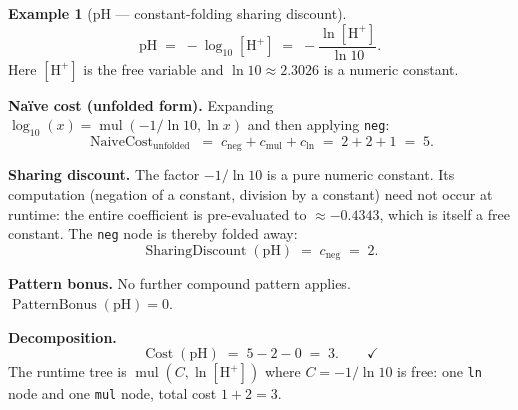 \documentclass[12pt,a4paper]{article}
\theoremstyle{definition}
\newtheorem{example}[theorem]{Example}
\newcommand{\Cost}{\operatorname{Cost}}
\newcommand{\NC}{\operatorname{NaiveCost}}
\newcommand{\SD}{\operatorname{SharingDiscount}}
\newcommand{\PB}{\operatorname{PatternBonus}}
\begin{document}
\begin{example}[pH --- constant-folding sharing discount]
\label{ex:ph}
\[
  \mathrm{pH} \;=\; -\log_{10}[\mathrm{H}^+]
             \;=\; -\frac{\ln[\mathrm{H}^+]}{\ln 10}.
\]
Here $[\mathrm{H}^+]$ is the free variable and $\ln 10 \approx 2.3026$ is
a numeric constant.

\textbf{Na\"{i}ve cost (unfolded form).}
Expanding $\log_{10}(x) = \operatorname{mul}(-1/\ln10, \ln x)$ and
then applying \texttt{neg}:
\[
  \NC_{\mathrm{unfolded}} \;=\; c_{\mathrm{neg}} + c_{\mathrm{mul}} + c_{\ln}
                           \;=\; 2 + 2 + 1 \;=\; 5.
\]

\textbf{Sharing discount.}
The factor $-1/\ln 10$ is a pure numeric constant.  Its computation
(negation of a constant, division by a constant) need not occur at
runtime: the entire coefficient is pre-evaluated to $\approx -0.4343$,
which is itself a free constant.  The \texttt{neg} node is thereby
folded away:
\[
  \SD(\mathrm{pH}) \;=\; c_{\mathrm{neg}} \;=\; 2.
\]

\textbf{Pattern bonus.}
No further compound pattern applies.  $\PB(\mathrm{pH}) = 0$.

\textbf{Decomposition.}
\[
  \Cost(\mathrm{pH}) \;=\; 5 - 2 - 0 \;=\; 3. \qquad \checkmark
\]
The runtime tree is $\operatorname{mul}(C, \ln[\mathrm{H}^+])$ where
$C = -1/\ln 10$ is free: one \texttt{ln} node and one \texttt{mul}
node, total cost $1 + 2 = 3$.
\end{example}
\end{document}
